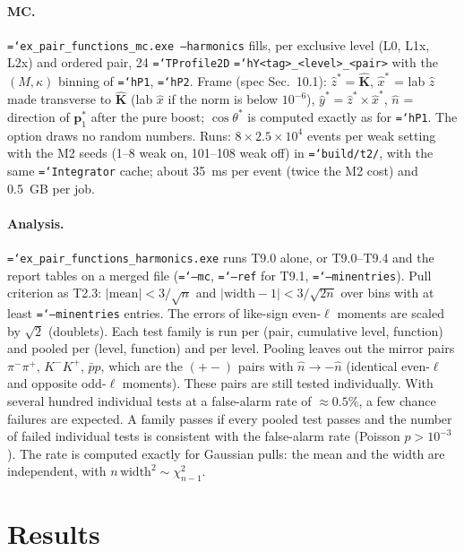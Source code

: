 \documentclass[11pt,a4paper]{article}
\newcommand{\code}[1]{\texttt{\hyphenchar\font=`\-#1}}
\begin{document}
\paragraph{MC.} \code{ex\_pair\_functions\_mc.exe --harmonics} fills, per exclusive level (L0, L1x,
L2x) and ordered pair, 24 \code{TProfile2D} \code{hY<tag>\_<level>\_<pair>} with the $(M,\kappa)$
binning of \code{hP1}, \code{hP2}. Frame (spec Sec.~10.1): $\hat z^*=\hat{\mathbf K}$,
$\hat x^*$ = lab $\hat z$ made transverse to $\hat{\mathbf K}$ (lab $\hat x$ if the norm is below
$10^{-6}$), $\hat y^*=\hat z^*\times\hat x^*$, $\hat n$ = direction of $\mathbf p_1^*$ after the
pure boost; $\cos\theta^*$ is computed exactly as for \code{hP1}. The option draws no random numbers.
Runs: $8\times2.5\times10^4$ events per weak setting with the M2 seeds (1--8 weak on, 101--108 weak
off) in \code{build/t2/}, with the same \code{Integrator} cache; about 35~ms per event (twice the
M2 cost) and 0.5~GB per job.

\paragraph{Analysis.} \code{ex\_pair\_functions\_harmonics.exe} runs T9.0 alone, or T9.0--T9.4 and the
report tables on a merged file (\code{--mc}, \code{--ref} for T9.1, \code{--minentries}). Pull
criterion as T2.3: $|\text{mean}|<3/\sqrt n$ and $|\text{width}-1|<3/\sqrt{2n}$ over bins with at
least \code{--minentries} entries. The errors of like-sign even-$\ell$ moments are scaled by $\sqrt2$
(doublets). Each test family is run per (pair, cumulative level, function) and pooled per (level,
function) and per level. Pooling leaves out the mirror pairs $\pi^-\pi^+$, $K^-K^+$, $\bar pp$,
which are the $(+-)$ pairs with $\hat n\to-\hat n$ (identical even-$\ell$ and opposite odd-$\ell$
moments). These pairs are still tested individually. With several hundred individual tests at a
false-alarm rate of $\approx0.5\%$, a few chance failures are expected. A family passes if every
pooled test passes and the number of failed individual tests is consistent with the false-alarm
rate (Poisson $p>10^{-3}$). The rate is computed exactly for Gaussian pulls: the mean and the
width are independent, with $n\,\text{width}^2\sim\chi^2_{n-1}$.

\section{Results}
\end{document}
